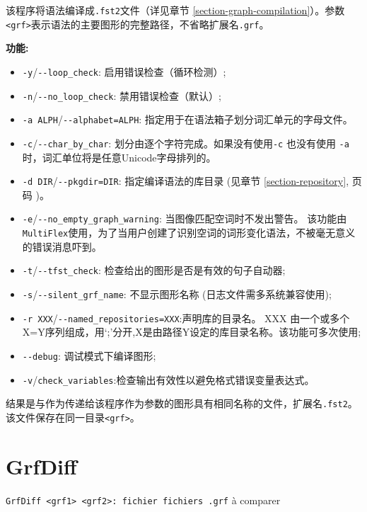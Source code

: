 \bigskip
\noindent {}
该程序将语法编译成\verb+.fst2+文件（详见章节 \ref{section-graph-compilation}）。参数\verb+<grf>+表示语法的主要图形的完整路径，不省略扩展名\verb+.grf+。


\bigskip
\noindent \textbf{功能:}
\begin{itemize}
  \item \verb+-y+/\verb+--loop_check+: 启用错误检查（循环检测）; 
  \item \verb+-n+/\verb+--no_loop_check+: 禁用错误检查（默认）;
  \item \verb+-a ALPH+/\verb+--alphabet=ALPH+: 指定用于在语法箱子划分词汇单元的字母文件。

  \item \verb+-c+/\verb+--char_by_char+: 划分由逐个字符完成。如果没有使用\verb+-c+ 也没有使用 \verb+-a+时，词汇单位将是任意Unicode字母排列的。
  \item \verb+-d DIR+/\verb+--pkgdir=DIR+: 指定编译语法的库目录 (见章节 \ref{section-repository}, 页码 \pageref{section-repository})。
  \item \verb+-e+/\verb+--no_empty_graph_warning+: 当图像匹配空词时不发出警告。 该功能由\verb+MultiFlex+使用，为了当用户创建了识别空词的词形变化语法，不被毫无意义的错误消息吓到。
  \item \verb+-t+/\verb+--tfst_check+: 检查给出的图形是否是有效的句子自动器;
\item \verb+-s+/\verb+--silent_grf_name+: 不显示图形名称
	(日志文件需多系统兼容使用);
\item \verb+-r XXX+/\verb+--named_repositories=XXX+:声明库的目录名。  XXX 由一个或多个X=Y序列组成，用`;'分开,X是由路径Y设定的库目录名称。该功能可多次使用;
\item \verb+--debug+: 调试模式下编译图形;
\item \verb+-v+/\verb+check_variables+:检查输出有效性以避免格式错误变量表达式。
\end{itemize}

\bigskip
\noindent 结果是与作为传递给该程序作为参数的图形具有相同名称的文件，扩展名\verb+.fst2+。该文件保存在同一目录\verb+<grf>+。





\section{GrfDiff}
\verb+GrfDiff <grf1> <grf2>: fichier fichiers .grf+  à comparer

